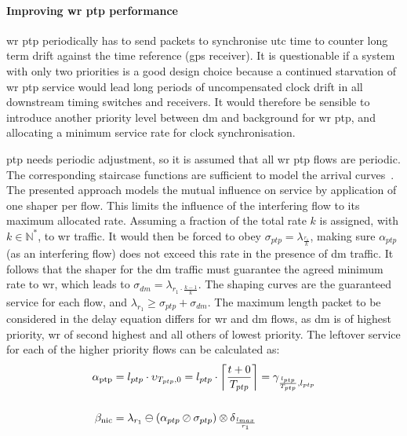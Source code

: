 \paragraph{Improving \gls{wr} \gls{ptp} performance}
\gls{wr} \gls{ptp} periodically has to send packets to synchronise \gls{utc} time to counter long term drift against the time reference (\gls{gps} receiver).
It is questionable if a system with only two priorities is a good design choice because a continued starvation of \gls{wr} \gls{ptp} service would lead
long periods of uncompensated clock drift in all downstream timing switches and receivers.
It would therefore be sensible to introduce another priority level between \gls{dm} and background for \gls{wr} \gls{ptp}, and allocating a minimum service rate for clock synchronisation.
\par
\gls{ptp} needs periodic adjustment, so it is assumed that all \gls{wr} \gls{ptp} flows are periodic. The corresponding staircase functions are sufficient to model the arrival curves~\cite[p. 8]{thiran_network_2001}.
The presented approach models the mutual influence on service by application of one shaper per flow. This limits the influence of the interfering flow to its maximum allocated rate.
Assuming a fraction of the total rate $k$ is assigned, with  $k \in \mathbb{N^*}$, to \gls{wr} traffic. It would then be forced to obey $\sigma_{ptp} = \lambda_{\frac{r_1}{k}}$, making sure $\alpha_{ptp}$ (as an interfering flow)
does not exceed this rate in the presence of \gls{dm} traffic. It follows that the shaper for the \gls{dm} traffic must guarantee the agreed minimum rate to \gls{wr}, which leads to $\sigma_{dm} = \lambda_{r_1 \cdot \frac{k-1}{k}}$.
The shaping curves are the guaranteed service for each flow, and $\lambda_{r_1} \ge \sigma_{ptp} + \sigma_{dm}$.
The maximum length packet to be considered in the delay equation differs for \gls{wr} and \gls{dm} flows, as \gls{dm} is of highest priority, \gls{wr} of second highest and all others of lowest priority.
The leftover service for each of the higher priority flows can be calculated as:
%
\begin{align}
\mathrm{\alpha_{ptp}} &= l_{ptp} \cdot \upsilon_{T_{ptp},0} = l_{ptp} \cdot \left \lceil \frac{t+0}{T_{ptp}} \right \rceil = \gamma_{\frac{l_{ptp}}{T_{ptp}}, l_{ptp}}\\
\notag\\
\mathrm{\beta_{nic}} &= \lambda_{r_1} \ominus (\alpha_{ptp} \oslash \sigma_{ptp}) \otimes \delta_{\frac{l_{max}}{r_1}}%
\end{align}


